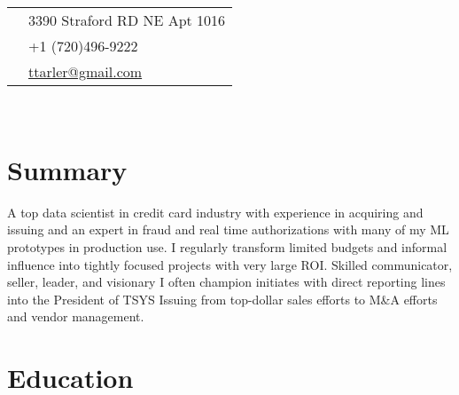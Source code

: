 \documentclass[10pt]{article} %
\begin{document}
\hfill
\begin{minipage}[t]{0.44\textwidth} %
\vspace{0pt} %


\colorbox{shade}{\textcolor{text1}{
\begin{tabular}{c|p{7cm}}
\raisebox{-4pt}{} & 3390 Straford RD NE Apt 1016\\ %
\raisebox{-3pt}{\Mobilefone} & +1 (720)496-9222 \\ %
\raisebox{-1pt}{\Letter} & \href{mailto:ttarler@gmail.com}{ttarler@gmail.com} \\ %
\end{tabular}
}
}\\[10pt]


\section{Summary} 

A top data scientist in credit card industry with experience in acquiring and issuing and an expert in fraud and real time authorizations with many of my ML prototypes in production use. I regularly transform limited budgets and informal influence into tightly focused projects with very large ROI. Skilled communicator, seller,  leader, and visionary I often champion initiates with direct reporting lines into the President of TSYS Issuing from top-dollar sales efforts to M\&A efforts and vendor management. 

	

\section{Education} 

\begin{tabular}{rl} %


\end{tabular}
\end{minipage}
\end{document}
